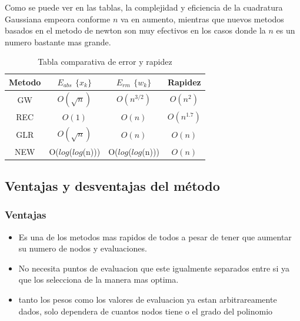 \documentclass[journal,transmag]{IEEEtran}
\theoremstyle{mytheoremstyle}
\theoremstyle{mytheoremstyle}
\theoremstyle{myproblemstyle}
\begin{document}
            Como se puede ver en las tablas, la complejidad y eficiencia de la cuadratura Gaussiana empeora conforme $n$ va en aumento, mientras que nuevos metodos basados en el metodo de newton son muy efectivos en los casos donde la $n$ es un numero bastante mas grande.
                        
                            \begin{table}[h]
                    \begin{center}
                        \caption{Tabla comparativa de error y rapidez}
                        \begin{tabular}{| c | c | c | c |}
                            \hline
                        Metodo & $E_{abs}$ $\lbrace$$x_k$$\rbrace$ & $E_{rm}$ $\lbrace$$w_k$$\rbrace$ &Rapidez\\ \hline 
                        GW & $O(\sqrt{n})$ & $O(n^{3/2})$ & $O(n^2)$ \\
                        REC & $O(1)$ & $O(n)$ & $O(n^{1.7})$ \\
                        GLR & $O(\sqrt{n})$ & $O(n)$ & $O(n)$ \\
                        NEW & O($log$($log$(n))) & O($log$($log$(n))) & $O(n)$ \\ \hline
                        \end{tabular}
                        \label{tab:tabla de error y rapidez}
                    \end{center}
                        \end{table}
            
            
            \subsection{Ventajas y desventajas del método}
                \subsubsection{Ventajas}
                        \begin{itemize}
                            \item   Es una de los metodos mas rapidos de todos a pesar de tener que aumentar su numero de nodos y evaluaciones. 
                            \item   No necesita puntos de evaluacion que este igualmente separados entre si ya que los selecciona de la manera mas optima.
                            \item tanto los pesos como los valores de evaluacion ya estan arbitrareamente dados, solo dependera de cuantos nodos tiene o el grado del polinomio
            
                    \end{itemize}
\end{document}
